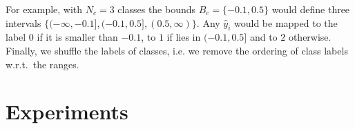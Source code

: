 \documentclass{article}
\begin{document}

For example, with $N_c = 3$ classes the bounds $B_c = \{-0.1, 0.5\}$ would define three intervals $\{(-\infty, -0.1], (-0.1, 0.5], (0.5, \infty)\}$. Any $\hat{y}_i$ would be mapped to the label $0$ if it is smaller than $-0.1$, to $1$ if lies in $(-0.1, 0.5]$ and to $2$ otherwise.
Finally, we shuffle the labels of classes, i.e. we remove the ordering of class labels w.r.t.\ the ranges.

\section{Experiments}\label{sec:experiments}
\end{document}
